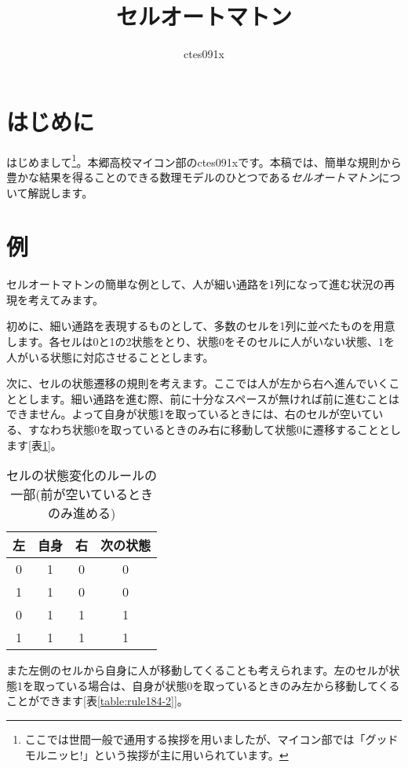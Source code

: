 \documentclass{jsarticle}
\title{セルオートマトン}
\author{ctes091x}
\begin{document}
\maketitle

\section{はじめに}
はじめまして\footnote{ここでは世間一般で通用する挨拶を用いましたが、マイコン部では「グッドモルニッヒ!」という挨拶が主に用いられています。}。本郷高校マイコン部のctes091xです。本稿では、簡単な規則から豊かな結果を得ることのできる数理モデルのひとつである\emph{セルオートマトン}について解説します。

\section{例}
セルオートマトンの簡単な例として、人が細い通路を1列になって進む状況の再現を考えてみます。

初めに、細い通路を表現するものとして、多数のセルを1列に並べたものを用意します。各セルは0と1の2状態をとり、状態0をそのセルに人がいない状態、1を人がいる状態に対応させることとします。

次に、セルの状態遷移の規則を考えます。ここでは人が左から右へ進んでいくこととします。細い通路を進む際、前に十分なスペースが無ければ前に進むことはできません。よって自身が状態1を取っているときには、右のセルが空いている、すなわち状態0を取っているときのみ右に移動して状態0に遷移することとします[表\ref{table:rule184-1}]。

\begin{table}[hbtp]
    \caption{セルの状態変化のルールの一部(前が空いているときのみ進める)}
    \label{table:rule184-1}
    \centering
    \begin{tabular}{|ccc|c|}
        \hline
        左 & 自身 & 右 & 次の状態\\
        \hline
        0 & 1 & 0 & 0\\
        1 & 1 & 0 & 0\\
        0 & 1 & 1 & 1\\
        1 & 1 & 1 & 1\\
        \hline
    \end{tabular}
\end{table}

また左側のセルから自身に人が移動してくることも考えられます。左のセルが状態1を取っている場合は、自身が状態0を取っているときのみ左から移動してくることができます[表\ref{table:rule184-2}]。
\end{document}
